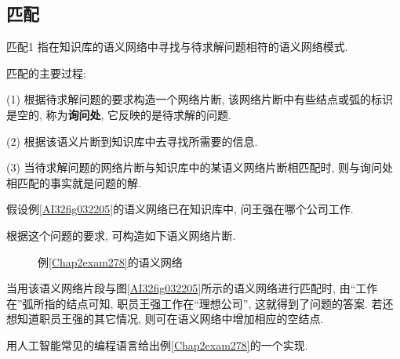 \subsection{匹配}
\begin{mydef}{匹配}{1}
    指在知识库的语义网络中寻找与待求解问题相符的语义网络模式.
\end{mydef}匹配的主要过程:

    (1) 根据待求解问题的要求构造一个网络片断, 该网络片断中有些结点或弧的标识是空的, 称为\textbf{询问处}, 它反映的是待求解的问题.

    (2) 根据该语义片断到知识库中去寻找所需要的信息.

    (3) 当待求解问题的网络片断与知识库中的某语义网络片断相匹配时, 则与询问处相匹配的事实就是问题的解.
\begin{example}\label{Chap2exam278}
    假设例\ref{AI32fig032205}的语义网络已在知识库中, 问王强在哪个公司工作.
\end{example}

根据这个问题的要求, 可构造如下语义网络片断.
\begin{figure}[H]
\begin{center}
\caption{例\ref{Chap2exam278}的语义网络}
\label{AI32fig105}
\end{center}
\end{figure}
当用该语义网络片段与图\ref{AI32fig032205}所示的语义网络进行匹配时, 由“工作在”弧所指的结点可知, 职员王强工作在“理想公司”, 这就得到了问题的答案.
若还想知道职员王强的其它情况, 则可在语义网络中增加相应的空结点.

\begin{think}
    用人工智能常见的编程语言给出例\ref{Chap2exam278}的一个实现.
\end{think}
